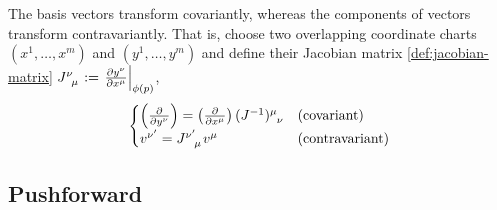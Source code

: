 \documentclass[../main.tex]{subfiles}
\begin{document}
    \begin{corollary}\label{cor:vec-coord-trans}
        The basis vectors transform covariantly, whereas the components of 
        vectors transform contravariantly. That is, choose two overlapping 
        coordinate charts \((x^1, \dots, x^m)\) and \((y^1, \dots, y^m)\) and define 
        their Jacobian matrix \cref{def:jacobian-matrix} \(J\indices{^\nu_\mu} := 
        \left.\frac{\partial y^\nu}{\partial x^\mu}\right|_{\phi(p)}\), 
        \[
        \begin{cases}
            \left(\frac{\partial }{\partial y^\nu}\right) = 
            \left(\frac{\partial }{\partial x^\mu}\right)(J^{-1})\indices{^\mu_\nu}
            & \text{(covariant)} \\
            v^{\nu'} = J\indices{^{\nu'}_\mu}v^\mu & \text{(contravariant)}
        \end{cases}
        \]
    \end{corollary}
    \subsection{Pushforward}
\end{document}
